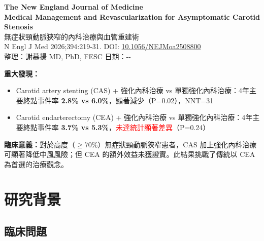 \documentclass[12pt,a4paper]{article}
\newcommand{\mydate}{\the\year-\the\month-\the\day}
\begin{document}
\begin{center}
{\LARGE\bfseries\textcolor{emergency_red}{The New England Journal of Medicine}}\\[0.5cm]
{\Large\textbf{Medical Management and Revascularization for Asymptomatic Carotid Stenosis}}\\[0.3cm]
{\large 無症狀頸動脈狹窄的內科治療與血管重建術}\\[0.5cm]
{\normalsize N Engl J Med 2026;394:219-31. DOI: \href{https://doi.org/10.1056/NEJMoa2508800}{10.1056/NEJMoa2508800}}\\[0.3cm]
{\normalsize 整理：謝慕揚 MD, PhD, FESC \quad 日期：\mydate}
\end{center}

\vspace{0.5cm}

\begin{tcolorbox}[colback=yellow!10!white,colframe=orange!75!black,title=\textbf{核心發現摘要}]
\textbf{重大發現：}
\begin{itemize}[noitemsep]
    \item Carotid artery stenting (CAS) + 強化內科治療 vs 單獨強化內科治療：4年主要終點事件率 \textbf{2.8\% vs 6.0\%}，顯著減少（P=0.02），NNT=31
    \item Carotid endarterectomy (CEA) + 強化內科治療 vs 單獨強化內科治療：4年主要終點事件率 \textbf{3.7\% vs 5.3\%}，\textcolor{red}{未達統計顯著差異}（P=0.24）
\end{itemize}

\textbf{臨床意義：}對於高度（$\geq$70\%）無症狀頸動脈狹窄患者，CAS 加上強化內科治療可顯著降低中風風險；但 CEA 的額外效益未獲證實。此結果挑戰了傳統以 CEA 為首選的治療觀念。
\end{tcolorbox}

\tableofcontents
\newpage

\section{研究背景}

\subsection{臨床問題}
\end{document}

